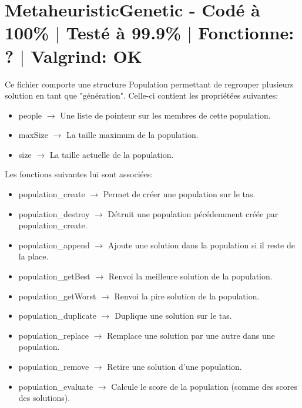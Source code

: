 \documentclass{EPUProjetPeiP}
\newcommand{\comp}[5]{
	\section[#1]{#1 {\small - Codé à #2\% $\vert$ Testé à #3\% $\vert$ Fonctionne: #4 $\vert$ Valgrind: #5}}
}
\begin{document}
\comp{MetaheuristicGenetic}{100}{99.9}{?}{OK}
Ce fichier comporte une structure Population permettant de regrouper plusieurs solution en tant que "génération". Celle-ci contient les propriétées suivantes:
\begin{itemize}
	\item people $\longrightarrow$ Une liste de pointeur sur les membres de cette population.
	\item maxSize $\longrightarrow$ La taille maximum de la population.
	\item size $\longrightarrow$ La taille actuelle de la population.\\
\end{itemize}

Les fonctions suivantes lui sont associées:
\begin{itemize}
	\item population\_create $\longrightarrow$ Permet de créer une population sur le tas.
	\item population\_destroy $\longrightarrow$ Détruit une population pécédemment créée par population\_create.
	\item population\_append $\longrightarrow$ Ajoute une solution dans la population si il reste de la place.
	\item population\_getBest $\longrightarrow$ Renvoi la meilleure solution de la population.
	\item population\_getWorst $\longrightarrow$ Renvoi la pire solution de la population.
	\item population\_duplicate $\longrightarrow$ Duplique une solution sur le tas.
	\item population\_replace $\longrightarrow$ Remplace une solution par une autre dans une population.
	\item population\_remove $\longrightarrow$ Retire une solution d'une population.
	\item population\_evaluate $\longrightarrow$ Calcule le score de la population (somme des scores des solutions).\\
\end{itemize}
\end{document}
